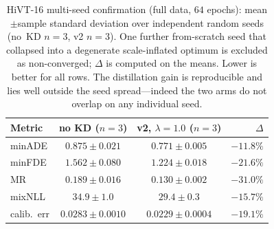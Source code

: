 \documentclass[conference]{IEEEtran}
\begin{document}
\begin{table}[htbp]
  \centering
  \caption{HiVT-16 multi-seed confirmation (full data, $64$ epochs):
    mean$\pm$sample standard deviation over independent random seeds (no~KD
    $n{=}3$, v2 $n{=}3$). One further from-scratch seed that collapsed into a
    degenerate scale-inflated optimum is excluded as non-converged;
    $\Delta$ is computed on the means. Lower is better
    for all rows. The distillation gain is reproducible and lies well outside the
    seed spread---indeed the two arms do not overlap on any individual seed.}
  \label{tab:seeds16}
  \begin{tabular}{lccr}
    \toprule
    Metric & no KD ($n{=}3$) & v2, $\lambda{=}1.0$ ($n{=}3$) & $\Delta$ \\
    \midrule
    minADE      & $0.875 \pm 0.021$   & $0.771 \pm 0.005$   & $-11.8\%$ \\
    minFDE      & $1.562 \pm 0.080$   & $1.224 \pm 0.018$   & $-21.6\%$ \\
    MR          & $0.189 \pm 0.016$   & $0.130 \pm 0.002$   & $-31.0\%$ \\
    mixNLL      & $34.9 \pm 1.0$      & $29.4 \pm 0.3$      & $-15.7\%$ \\
    calib.\ err & $0.0283 \pm 0.0010$ & $0.0229 \pm 0.0004$ & $-19.1\%$ \\
    \bottomrule
  \end{tabular}
\end{table}

\end{document}
